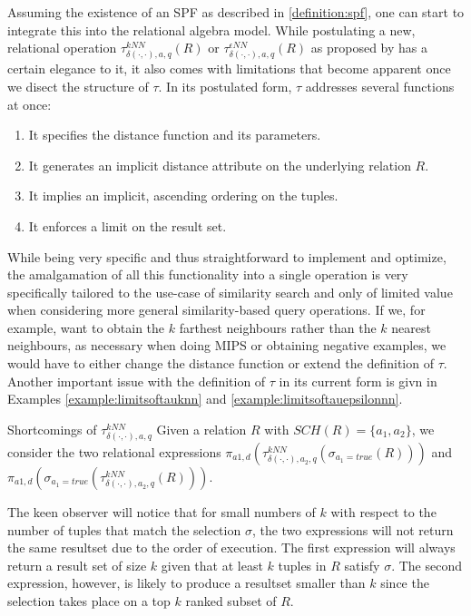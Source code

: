 Assuming the existence of an SPF as described in \cref{definition:spf}, one can start to integrate this into the relational algebra model. While postulating a new, relational operation $\tau^{kNN}_{\delta(\cdot,\cdot),a,q}(R)$ or $\tau^{\epsilon NN}_{\delta(\cdot,\cdot),a,q}(R)$ as proposed by \cite{Giangreco:2018thesis} has a certain elegance to it, it also comes with limitations that become apparent once we disect the structure of $\tau$. In its postulated form, $\tau$ addresses several functions at once:

\begin{enumerate}
    \item It specifies the distance function and its parameters.
    \item It generates an implicit distance attribute on the underlying relation $R$.
    \item It implies an implicit, ascending ordering on the tuples.
    \item It enforces a limit on the result set.
\end{enumerate}

While being very specific and thus straightforward to implement and optimize, the amalgamation of all this functionality into a single operation is very specifically tailored to the use-case of similarity search and only of limited value when considering more general similarity-based query operations. If we, for example, want to obtain the $k$ farthest neighbours rather than the $k$ nearest neighbours, as necessary when doing MIPS or obtaining negative examples, we would have to either change the distance function or extend the definition of $\tau$. Another important issue with the definition of $\tau$ in its current form is givn in Examples \ref{example:limitsoftauknn} and \ref{example:limitsoftauepsilonnn}.

\begin{example}[label=example:limitsoftauknn]{Shortcomings of $\tau^{kNN}_{\delta(\cdot,\cdot),a,q}$}{}
    Given a relation $R$ with $SCH(R) = \{ a_1, a_2 \}$, we consider the two relational expressions $\pi_{a1,d}(\tau^{kNN}_{\delta(\cdot,\cdot),a_2,q}(\sigma_{a_1 = true}(R)))$ and $\pi_{a1,d}(\sigma_{a_1 = true}(\tau^{kNN}_{\delta(\cdot,\cdot),a_2,q}(R)))$. 
    
    The keen observer will notice that for small numbers of $k$ with respect to the number of tuples that match the selection $\sigma$, the two expressions will not return the same resultset due to the order of execution. The first expression will always return a result set of size $k$ given that at least $k$ tuples in $R$ satisfy $\sigma$. The second expression, however, is likely to produce a resultset smaller than $k$ since the selection takes place on a top $k$ ranked subset of $R$.
\end{example}

